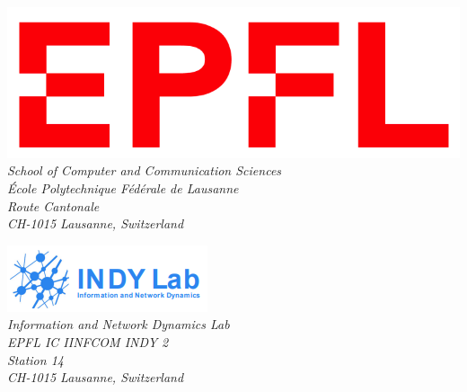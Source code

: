 \begin{titlepage}
\begin{minipage}[t]{0.5\textwidth}
    \centering
    \includegraphics[width=0.8\linewidth]{img/logo_epfl.png}\\[0.5cm]
    \textit{School of Computer and Communication Sciences}\\
    \textit{École Polytechnique Fédérale de Lausanne}\\
    \textit{Route Cantonale}\\
    \textit{CH-1015 Lausanne, Switzerland}
\end{minipage}%
\begin{minipage}[t]{0.5\textwidth}
    \centering
    \includegraphics[width=0.8\linewidth]{img/logo_indy_lab.png}\\[0.5cm]
    \textit{Information and Network Dynamics Lab}\\
    \textit{EPFL IC IINFCOM INDY 2}\\
    \textit{Station 14}\\
    \textit{CH-1015 Lausanne, Switzerland}
\end{minipage}

\vfill %

\end{titlepage}
